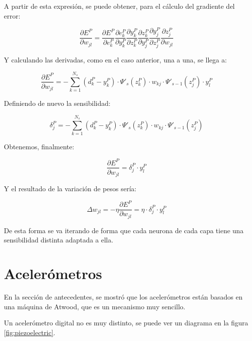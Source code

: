\documentclass[12pt]{book}
\numberwithin{equation}{section}
\begin{document}
A partir de esta expresión, se puede obtener, para el cálculo del gradiente del error:

\begin{equation}
\frac{\partial E^P}{\partial w_{jl}} = \frac{\partial E^P}{\partial e_{k}^P} \frac{\partial e^P_k}{\partial y_{k}^P} \frac{\partial y^P_k}{\partial z_{k}^P} \frac{\partial z^P_k}{\partial y_j^P} \frac{\partial y^P_j}{\partial z_j^P} \frac{\partial z^P_j}{\partial w_{jl}}
\end{equation}

Y calculando las derivadas, como en el caso anterior, una a una, se llega a:

\begin{equation}
\frac{\partial E^P}{\partial w_{jl}} =-\sum _{k=1}^{N_s}(d_k^P-y_k^P) \cdot \Psi ' _s(z_k^P) \cdot w_{kj} \cdot \Psi '_{s-1}(z_j^P) \cdot y_l^P
\end{equation}

Definiendo de nuevo la sensibilidad:

\begin{equation}
\delta _j^P = -\sum _{k=1}^{N_s}(d_k^P-y_k^P) \cdot \Psi ' _s(z_k^P) \cdot w_{kj} \cdot \Psi '_{s-1}(z_j^P)
\end{equation}

Obtenemos, finalmente:

\begin{equation}
\frac{\partial E^P}{\partial w_{jl}} = \delta _j^P \cdot y_l^P
\end{equation}

Y el resultado de la variación de pesos sería: 

\begin{equation}
\Delta w_{jl} = -\eta \frac{\partial E^P}{\partial w_{jl}} = \eta \cdot \delta _j^P \cdot y_l^P
\end{equation}

De esta forma se va iterando de forma que cada neurona de cada capa tiene una sensibilidad distinta adaptada a ella.

\section{Acelerómetros}

En la sección de antecedentes, se mostró que los acelerómetros están basados en una máquina de Atwood, que es un mecanismo muy sencillo.

Un acelerómetro digital no es muy distinto, se puede ver un diagrama en la figura \ref{fig:piezoelectric}.
\end{document}

